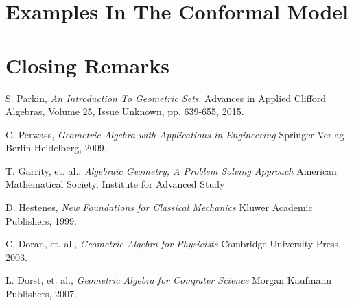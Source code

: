 \documentclass{birkjour}
\theoremstyle{definition}
\theoremstyle{remark}
\numberwithin{equation}{section}
\begin{document}
\section{Examples In The Conformal Model}

\section{Closing Remarks}

\begin{thebibliography}{9}

S. Parkin,
\emph{An Introduction To Geometric Sets}.
Advances in Applied Clifford Algebras, Volume 25, Issue Unknown, pp. 639-655, 2015.

C. Perwass,
\emph{Geometric Algebra with Applications in Engineering}
Springer-Verlag Berlin Heidelberg, 2009.

T. Garrity, et. al.,
\emph{Algebraic Geometry, A Problem Solving Approach}
American Mathematical Society, Institute for Advanced Study

D. Hestenes,
\emph{New Foundations for Classical Mechanics}
Kluwer Academic Publishers, 1999.

C. Doran, et. al.,
\emph{Geometric Algebra for Physicists}
Cambridge University Press, 2003.

L. Dorst, et. al.,
\emph{Geometric Algebra for Computer Science}
Morgan Kaufmann Publishers, 2007.

\end{thebibliography}
\end{document}
